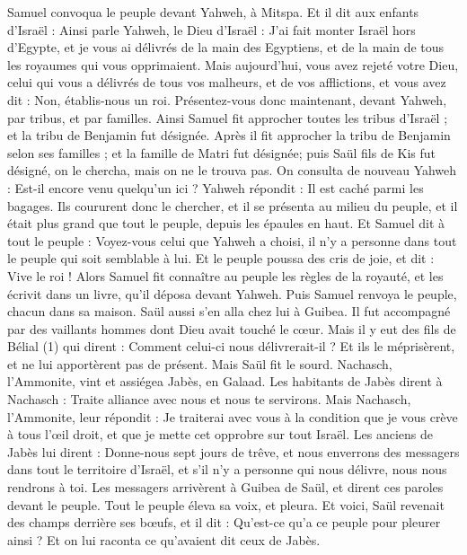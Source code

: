 \begin{multicols}{2}
Samuel convoqua le peuple devant Yahweh, à Mitspa.
Et il dit aux enfants d'Israël : Ainsi parle Yahweh, le Dieu d'Israël : J'ai fait monter Israël hors d'Egypte, et je vous ai délivrés de la main des Egyptiens, et de la main de tous les royaumes qui vous opprimaient.
Mais aujourd'hui, vous avez rejeté votre Dieu, celui qui vous a délivrés de tous vos malheurs, et de vos afflictions, et vous avez dit : Non, établis-nous un roi. Présentez-vous donc maintenant, devant Yahweh, par tribus, et par familles.
Ainsi Samuel fit approcher toutes les tribus d'Israël ; et la tribu de Benjamin fut désignée.
Après il fit approcher la tribu de Benjamin selon ses familles ; et la famille de Matri fut désignée; puis Saül fils de Kis fut désigné, on le chercha, mais on ne le trouva pas.
On consulta de nouveau Yahweh : Est-il encore venu quelqu’un ici ? Yahweh répondit : Il est caché parmi les bagages.
Ils coururent donc le chercher, et il se présenta au milieu du peuple, et il était plus grand que tout le peuple, depuis les épaules en haut.
Et Samuel dit à tout le peuple : Voyez-vous celui que Yahweh a choisi, il n'y a personne dans tout le peuple qui soit semblable à lui. Et le peuple poussa des cris de joie, et dit : Vive le roi !
Alors Samuel fit connaître au peuple les règles de la royauté, et les écrivit dans un livre, qu’il déposa devant Yahweh. Puis Samuel renvoya le peuple, chacun dans sa maison.
Saül aussi s'en alla chez lui à Guibea. Il fut accompagné par des vaillants hommes dont Dieu avait touché le cœur.
Mais il y eut des fils de Bélial (1) qui dirent : Comment celui-ci nous délivrerait-il ? Et ils le méprisèrent, et ne lui apportèrent pas de présent. Mais Saül fit le sourd.
\VerseOne{}Nachasch, l’Ammonite, vint et assiégea Jabès, en Galaad. Les habitants de Jabès dirent à Nachasch : Traite alliance avec nous et nous te servirons.
Mais Nachasch, l’Ammonite, leur répondit : Je traiterai avec vous à la condition que je vous crève à tous l’œil droit, et que je mette cet opprobre sur tout Israël.
Les anciens de Jabès lui dirent : Donne-nous sept jours de trêve, et nous enverrons des messagers dans tout le territoire d'Israël, et s'il n'y a personne qui nous délivre, nous nous rendrons à toi.
Les messagers arrivèrent à Guibea de Saül, et dirent ces paroles devant le peuple. Tout le peuple éleva sa voix, et pleura.
Et voici, Saül revenait des champs derrière ses bœufs, et il dit : Qu'est-ce qu'a ce peuple pour pleurer ainsi ? Et on lui raconta ce qu'avaient dit ceux de Jabès.

\end{multicols}
